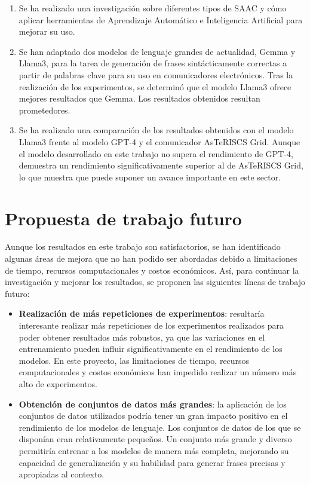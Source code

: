 \documentclass[11pt,spanish,listoffigures,listoftables]{tfgetsinf}
\begin{document}
\begin{enumerate}
	\item Se ha realizado una investigación sobre diferentes tipos de SAAC y cómo aplicar herramientas de Aprendizaje Automático e Inteligencia Artificial para mejorar su uso.
	\item Se han adaptado dos modelos de lenguaje grandes de actualidad, Gemma y Llama3, para la tarea de generación de frases sintácticamente correctas a partir de palabras clave para su uso en comunicadores electrónicos. Tras la realización de los experimentos, se determinó que el modelo Llama3 ofrece mejores resultados que Gemma. Los resultados obtenidos resultan prometedores.
	\item Se ha realizado una comparación de los resultados obtenidos con el modelo Llama3 frente al modelo GPT-4 y el comunicador AsTeRISCS Grid. Aunque el modelo desarrollado en este trabajo no supera el rendimiento de GPT-4, demuestra un rendimiento significativamente superior al de AsTeRISCS Grid, lo que muestra que puede suponer un avance importante en este sector.
\end{enumerate}

\section{Propuesta de trabajo futuro}

Aunque los resultados en este trabajo son satisfactorios, se han identificado algunas áreas de mejora que no han podido ser abordadas debido a limitaciones de tiempo, recursos computacionales y costos económicos. Así, para continuar la investigación y mejorar los resultados, se proponen las siguientes líneas de trabajo futuro:

\begin{itemize}
	\item \textbf{Realización de más repeticiones de experimentos}: resultaría interesante realizar más repeticiones de los experimentos realizados para poder obtener resultados más robustos, ya que las variaciones en el entrenamiento pueden influir significativamente en el rendimiento de los modelos. En este proyecto, las limitaciones de tiempo, recursos computacionales y costos económicos han impedido realizar un número más alto de experimentos.
	\item \textbf{Obtención de conjuntos de datos más grandes}: la aplicación de los conjuntos de datos utilizados podría tener un gran impacto positivo en el rendimiento de los modelos de lenguaje. Los conjuntos de datos de los que se disponían eran relativamente pequeños. Un conjunto más grande y diverso permitiría entrenar a los modelos de manera más completa, mejorando su capacidad de generalización y su habilidad para generar frases precisas y apropiadas al contexto.
\end{itemize}
\end{document}
